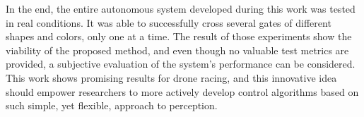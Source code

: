 In the end, the entire autonomous system developed during this work was tested
in real conditions. It was able to successfully cross several gates of
different shapes and colors, only one at a time. The result of those
experiments show the viability of the proposed method, and even though no
valuable test metrics are provided, a subjective evaluation of the system's
performance can be considered. This work shows promising results for drone
racing, and this innovative idea should empower researchers to more actively
develop control algorithms based on such simple, yet flexible, approach to
perception.
